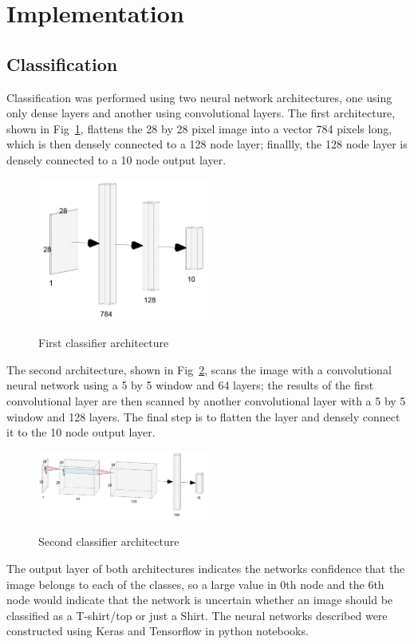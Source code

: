 \documentclass[conference]{IEEEtran}
\begin{document}
    \section{Implementation}\label{sec:implementation}

    \subsection{Classification}\label{subsec:implementation-classification}
    
    Classification was performed using two neural network architectures, one using only dense layers and another using convolutional layers. The first architecture, shown in Fig~\ref{figclass1}, flattens the 28 by 28 pixel image into a vector 784 pixels long, which is then densely connected to a 128 node layer; finallly, the 128 node layer is densely connected to a 10 node output layer.
    \begin{figure}[!h]
    \begin{center}
    \caption{First classifier architecture}
    \includegraphics[width=0.5\textwidth]{First_Classifier_Architecture.png}
    \label{figclass1}
    \end{center}
    \end{figure}
    The second architecture, shown in Fig~\ref{figclass2}, scans the image with a convolutional neural network using a 5 by 5 window and 64 layers; the results of the first convolutional layer are then scanned by another convolutional layer with a 5 by 5 window and 128 layers. The final step is to flatten the layer and densely connect it to the 10 node output layer.
    \begin{figure}[!h]
    \begin{center}
    \caption{Second classifier architecture}
    \includegraphics[width=0.5\textwidth]{Second_Classifier_Architecture.png}
    \label{figclass2}
    \end{center}
    \end{figure}
The output layer of both architectures indicates the networks confidence that the image belongs to each of the classes, so a large value in 0th node and the 6th node would indicate that the network is uncertain whether an image should be classified as a T-shirt/top or just a Shirt. The neural networks described were constructed using Keras and Tensorflow in python notebooks.
    
\end{document}
